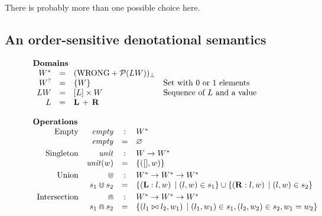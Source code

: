 There is probably more than one possible choice here.


\subsection{An order-sensitive denotational semantics} \label{sec:order-sensitive}

\newcommand{\LblValue}{LW}
\newcommand{\LblSeq}{[ \Lbl ]}
\newcommand{\Lbl}{L}
\newcommand{\lblleft}{{\bf L}}
\newcommand{\lblright}{{\bf R}}
\newcommand{\lblsemi}[2]{#1 \sconcat #2}
\newcommand{\lblunit}{\bullet}
\newcommand{\domplus}{\, + \,}
\newcommand{\msort}{\mathit{sort}}

\begin{figure}
$$
\begin{array}{l}
\text{\bf Domains} \\
\begin{array}{rcll}
\mtype & = & \mlift{(\wrong + \powerset{\LblValue})} \\
\mtyped & = & \setform{\Value} & \text{Set with 0 or 1 elements} \\
\LblValue & = & \LblSeq \times \Value & \text{Sequence of $\Lbl$ and a value} \\
\Lbl & = & \lblleft \domplus \lblright \\
\end{array} \\
\\
\text{\bf Operations} \\
\begin{array}{rrcll}
\text{Empty}        & \mempty & : &  \mtype \\
    & \mempty & = & \varnothing \\[1mm]
\text{Singleton}    & \munit & : & \Value \rightarrow \mtype \\
     & \munits{w} & = & \setform{ ([], w) } \\[1mm]
\text{Union}        & \munion & : & \mtype \rightarrow \mtype \rightarrow \mtype \\
 &  s_1 \munion s_2 & = & \scompr{(\lblleft \scons l,w)}{\sbind{(l,w)}{s_1}} \cup
                                              \scompr{(\lblright \scons l, w)}{\sbind{(l,w)}{s_2}} \\[1mm]
\text{Intersection} & \mintersect & : & \mtype \rightarrow \mtype \rightarrow \mtype \\
 &  s_1 \mintersect s_2 & = & \scompr{(\lblsemi{l_1}{l_2},w_1)}{\sbind{(l_1,w_1)}{s_1}, \sbind{(l_2,w_2)}{s_2}, w_1=w_2} \\[1mm]

\end{array}
\end{array}$$
\end{figure}

